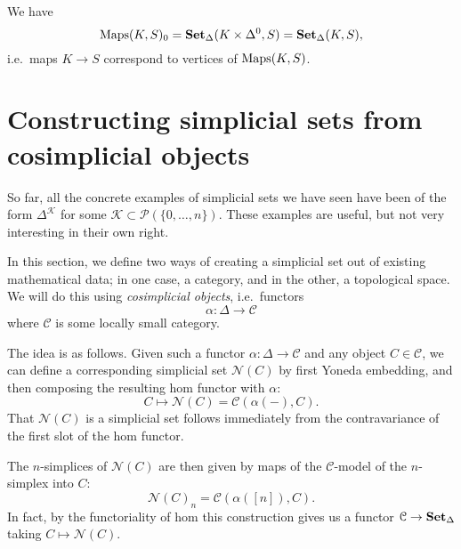 \documentclass[main.tex]{subfiles}
\begin{document}
\begin{note}
  \label{note:morphisms_are_vertices_of_mapping_space}
  We have
  \begin{equation*}
    \operatorname{Maps}(K, S)_{0} = \operatorname{\mathbf{Set}_{\Delta}}(K \times \Delta^{0}, S) = \operatorname{\mathbf{Set}_{\Delta}}(K, S),
  \end{equation*}
  i.e.\ maps $K \to S$ correspond to vertices of $\operatorname{Maps}(K, S)$.
\end{note}

\section{Constructing simplicial sets from cosimplicial objects}
\label{sec:simplicial_sets_from_cosimplicial_objects}

So far, all the concrete examples of simplicial sets we have seen have been of the form $\Delta^{\mathcal{K}}$ for some $\mathcal{K} \subset \mathcal{P}(\{0, \ldots, n\})$. These examples are useful, but not very interesting in their own right.

In this section, we define two ways of creating a simplicial set out of existing mathematical data; in one case, a category, and in the other, a topological space. We will do this using \emph{cosimplicial objects}, i.e.\ functors
\begin{equation*}
  \alpha\colon \Delta \to \mathcal{C}
\end{equation*}
where $\mathcal{C}$ is some locally small category.

The idea is as follows. Given such a functor $\alpha\colon \Delta \to \mathcal{C}$ and any object $C \in \mathcal{C}$, we can define a corresponding simplicial set $\mathcal{N}(C)$ by first Yoneda embedding, and then composing the resulting hom functor with $\alpha$:
\begin{equation*}
  C \mapsto \mathcal{N}(C) = \mathcal{C}(\alpha(-), C).
\end{equation*}
That $\mathcal{N}(C)$ is a simplicial set follows immediately from the contravariance of the first slot of the hom functor.

The $n$-simplices of $\mathcal{N}(C)$ are then given by maps of the $\mathcal{C}$-model of the $n$-simplex into $C$:
\begin{equation*}
  \mathcal{N}(C)_{n} = \mathcal{C}(\alpha([n]), C).
\end{equation*}
In fact, by the functoriality of hom this construction gives us a functor $\mathcal{C} \to \operatorname{\mathbf{Set}_{\Delta}}$ taking $C \mapsto \mathcal{N}(C)$.
\end{document}
